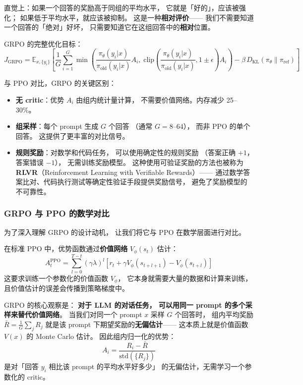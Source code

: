 直觉上：如果一个回答的奖励高于同组的平均水平，
它就是「好的」，应该被强化；
如果低于平均水平，就应该被抑制。
这是一种\textbf{相对评价}——
我们不需要知道一个回答的「绝对」好坏，
只需要知道它在这组回答中的\textbf{相对}位置。

GRPO 的完整优化目标：
\begin{equation}
  J_{\text{GRPO}} = \mathbb{E}_{x, \{y_i\}} \left[
    \frac{1}{G} \sum_{i=1}^{G}
    \min\!\left(
      \frac{\pi_\theta(y_i|x)}{\pi_{\text{old}}(y_i|x)} A_i,\;
      \mathrm{clip}\!\left(
        \frac{\pi_\theta(y_i|x)}{\pi_{\text{old}}(y_i|x)},
        1 \pm \epsilon
      \right) A_i
    \right)
    - \beta \, D_{\text{KL}}(\pi_\theta \| \pi_{\text{ref}})
  \right]
  \label{eq:grpo-objective}
\end{equation}

与 PPO 对比，GRPO 的关键区别：
\begin{itemize}[noitemsep]
  \item \textbf{无 critic}：优势 $A_i$ 由组内统计量计算，
        不需要价值网络。内存减少 25--30\%。
  \item \textbf{组采样}：每个 prompt 生成 $G$ 个回答
       （通常 $G = 8$--$64$），
        而非 PPO 的单个回答。
        这提供了更丰富的对比信号。
  \item \textbf{规则奖励}：对数学和代码任务，
        可以使用确定性的规则奖励
       （答案正确 $+1$，答案错误 $-1$），
        无需训练奖励模型。
        这种使用可验证奖励的方法也被称为
        \textbf{RLVR}（Reinforcement Learning with Verifiable Rewards）——
        通过数学答案比对、代码执行测试等确定性验证手段提供奖励信号，
        避免了奖励模型的不可靠性。
\end{itemize}

\subsubsection{GRPO 与 PPO 的数学对比}

为了深入理解 GRPO 的设计动机，
让我们将它与 PPO 在数学层面进行对比。

在标准 PPO 中，优势函数通过\textbf{价值网络} $V_\phi(s_t)$ 估计：
\begin{equation}
  A_t^{\text{PPO}} = \sum_{l=0}^{T-t} (\gamma \lambda)^l
  \left[ r_t + \gamma V_\phi(s_{t+l+1}) - V_\phi(s_{t+l}) \right]
\end{equation}
这要求训练一个参数化的价值函数 $V_\phi$，
它本身就需要大量的数据和计算来训练，
且价值估计的误差会传播到策略梯度中。

GRPO 的核心观察是：
\textbf{对于 LLM 的对话任务，
可以用同一 prompt 的多个采样来替代价值网络}。
当我们对同一个 prompt $x$ 采样 $G$ 个回答时，
组内平均奖励 $\bar{R} = \frac{1}{G}\sum_j R_j$
就是该 prompt 下期望奖励的\textbf{无偏估计}——
这本质上就是价值函数 $V(x)$ 的 Monte Carlo 估计。
因此组内归一化的优势：
\[
  A_i = \frac{R_i - \bar{R}}{\text{std}(\{R_j\})}
\]
是对「回答 $y_i$ 相比该 prompt 的平均水平好多少」
的无偏估计，无需学习一个参数化的 critic。

